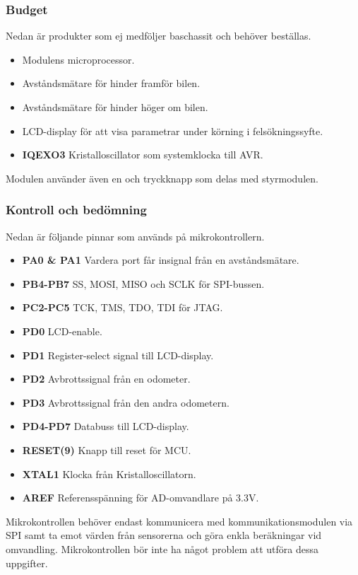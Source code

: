 \documentclass[designspec/spec.tex]{subfiles}
\begin{document}
\subsubsection{Budget}
Nedan är produkter som ej medföljer baschassit och behöver beställas.
\begin{itemize}
	\item \textbf{\modMicrocontroller} Modulens microprocessor. 
    \item \textbf{\modDistf} Avståndsmätare för hinder framför bilen.
    \item \textbf{\modDists} Avståndsmätare för hinder höger om bilen.
    \item \textbf{\modLcd} LCD-display för att visa parametrar under körning
    i felsökningssyfte.
    \item \textbf{IQEXO3} Kristalloscillator som systemklocka till AVR.
\end{itemize}
Modulen använder även en {\modJtag} och tryckknapp som delas med styrmodulen.

\subsubsection{Kontroll och bedömning}
Nedan är följande pinnar som används på mikrokontrollern.
\begin{itemize}
   \item \textbf{PA0 \& PA1} Vardera port får insignal från en avståndsmätare.
   \item \textbf{PB4-PB7} SS, MOSI, MISO och SCLK för SPI-bussen.
   \item \textbf{PC2-PC5} TCK, TMS, TDO, TDI för JTAG.
   \item \textbf{PD0} LCD-enable.
   \item \textbf{PD1} Register-select signal till LCD-display.
   \item \textbf{PD2} Avbrottssignal från en odometer.
   \item \textbf{PD3} Avbrottssignal från den andra odometern.
   \item \textbf{PD4-PD7} Databuss till LCD-display.
   \item \textbf{RESET(9)} Knapp till reset för MCU.
   \item \textbf{XTAL1} Klocka från Kristalloscillatorn. 
   \item \textbf{AREF} Referensspänning för AD-omvandlare på 3.3V.

\end{itemize}
Mikrokontrollen behöver endast kommunicera med kommunikationsmodulen via SPI
samt ta emot värden från sensorerna och göra enkla beräkningar vid omvandling.
Mikrokontrollen bör inte ha något problem att utföra dessa uppgifter.
\end{document}
